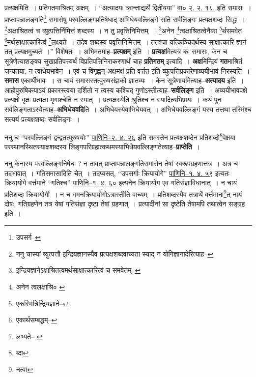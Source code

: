 \documentclass[article,12pt,a4paper]{memoir}
\begin{document}
	प्रत्यक्षमिति । प्रतिगतमाश्रितम् अक्षम् । “अत्यादयः क्रान्ताद्यर्थे द्वितीयया” \href{http://http://sarit.indology.info/?cref=htu.90}{वा० २. २. १८.} इति समासः । प्राप्तापन्नालङ्गति\footnote{उपसर्ग--\cite{dp-msD-n}} समासेषु परवल्लिङ्गप्रतिषेधाद् अभिधेयवल्लिङ्गे सति सर्वलिङ्गः प्रत्यक्षशब्दः सिद्धः । \footnote{ननु चास्यां व्युत्पत्तौ इन्द्रियज्ञानस्यैव प्रत्यक्षशब्दवाच्यता स्याद् न योगिज्ञानादेरित्याह--\cite{dp-msD-n}}अक्षाश्रितत्वं च व्युत्पत्तिर्निमित्तं शब्दस्य । न तु प्रवृत्तिनिमित्तम् । \footnote{इन्द्रियज्ञानेऽक्षाश्रितत्वमर्थसाक्षात्कारित्वं च समवेतम्--\cite{dp-msD-n}}अनेन \footnote{अनेन त्वलक्षाश्रि० \cite{dp-msA}}त्वक्षाश्रितत्वेनैका \footnote{एकस्मिन्निन्द्रियज्ञाने--\cite{dp-msD-n}}र्थसमवेत \footnote{एकार्थसम्बद्धम्--\cite{dp-msD-n}}मर्थसाक्षात्कारित्वं \footnote{लभ्यते--\cite{dp-msB} \cite{dp-edN}}लक्ष्यते । तदेव शब्दस्य प्रवृत्तिनिमित्तम् । ततश्चा यत्किञ्चिदर्थस्य साक्षात्कारि ज्ञानं तत् प्रत्यक्षमुच्यते ।” विशेषतः । अभिमतमाह--\textbf{प्रत्यक्षम्} इति । \textbf{प्रत्यक्ष}मित्यत्र कः समासः, केन च सूत्रेणेत्याशङ्क्य सुखप्रतिपत्त्यर्थं विप्रतिपत्तिनिराकरणार्थं चाह \textbf{प्रतिगतम्} इत्यादि । \textbf{अक्ष}मिन्द्रियं \textbf{गत}माश्रितं जन्यतया, न त्वाधेयभावेन । एवं च विगृह्णन् अक्षमक्षं प्रति वर्त्तत इति व्युत्पत्तिप्रकारेणाव्ययीभावं निरस्यति । \textbf{समास} एकार्थीभावः । स चायं समासस्तत्पुरुषसंज्ञको ज्ञातव्यः । केन सूत्रेणायमित्याह--\textbf{अत्यादय} इति । आहोपुरुषिकयाऽयं प्रकारस्त्वया दर्शितो न त्वस्य कश्चिद् गुणोऽस्तीत्याह--\textbf{सर्वलिङ्ग} इति । अव्ययीभावपक्षे प्रत्यक्षो वृक्षः प्रत्यक्षा मृगाश्चेति न स्यात् । प्रत्यक्षस्येति श्रुतिश्च न स्यादित्यभिप्रायः । कथं पुनः सर्वलिङ्गताऽस्येत्याह--\textbf{अभिधेयवदि}ति । अभिधेयस्येवाभिधेयवत् । अभिधेयवल्लिङ्गं यस्य तत्तथा तस्मिंश्च सत्ययं प्रत्यक्षशब्दः सर्वलिङ्गः ।
	\pend
      

	  \pstart ननु च “परवल्लिङ्गं द्वन्द्वतत्पुरुषयोः” \href{http://http://sarit.indology.info/?cref=Pā.2.4.26}{पाणिनि--२. ४. २६} इति समस्तेन प्रत्यक्षशब्देन प्रतिशब्दो\footnote{ब्दा}पेक्षया परस्थानस्थितस्याक्षशब्दस्य लिङ्गपरिग्रहात्कथमस्याभिधेयवल्लिङ्गतेत्याह--\textbf{प्राप्तेति} ।
	\pend
      

	  \pstart ननु केनास्य परवल्लिङ्गनिषेधः ? न तावत् प्राप्तापन्नालङ्गतिसमासेन तेषां स्वरूपग्रहणात्तत्र । अत्र च तदभावात् । गतिसमासादिति चेत् । तदप्यसत्, “उपसर्गाः क्रियायोगे” \href{http://http://sarit.indology.info/?cref=Pā.1.4.59}{पाणिनि--१. ४. ५९} इत्यतः क्रियायोगे वर्त्तमाने “गतिश्च” \href{http://http://sarit.indology.info/?cref=Pā.1.4.60}{पाणिनि--१. ४. ६०} इत्यनेन क्रियायोग एव गतिसंज्ञाविधानात् । न चायं प्रतिशब्दः क्रियायोगी । न च गमनक्रियायोगोऽत्रास्तीति वाच्यम् । प्रतिशब्दस्यैव तत्रार्थे वर्त्तमाना\footnote{नत्वा}त् नायं दोषः, गतिग्रहणेन तत्र येषां गतिसंज्ञा दृष्टा तेषां ग्रहणात् । प्रत्यादीनां सा दृष्टेति तेषामपि तथात्वेन सङ्ग्रह इति ।
	\pend
      
\end{document}
